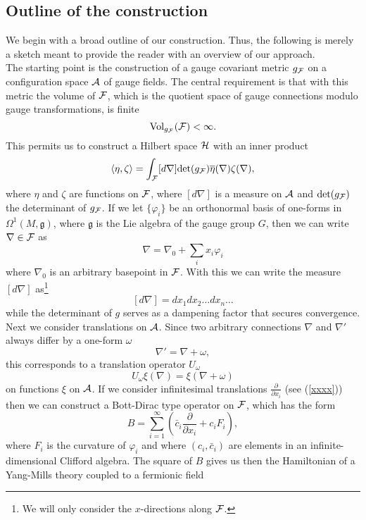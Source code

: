 \documentclass[letterpaper,12pt]{article}
\def\OO{\Omega}
\def\ca{{\cal A}}
\def\cf{{\cal F}}
\def\ch{{\cal H}}
\newcommand{\pa}{\partial}
\begin{document}
\subsection{Outline of the construction}



We begin with a broad outline of 
our construction. Thus, the following is merely a sketch meant to provide the reader with an overview of our approach.\\

The starting point is the construction of a gauge covariant metric $g_\cf$ on a configuration space $\ca$ of gauge fields. The central requirement is that with this metric the volume of $\cf$, which is the quotient space of gauge connections modulo gauge transformations, is finite
$$
\mbox{Vol}_{g_\cf}(\cf) < \infty.
$$
This permits us to construct a Hilbert space $\ch$ with an inner product
$$
\langle \eta, \zeta\rangle = \int_\cf [d\nabla] \mbox{det}(g_\cf)   \overline{\eta}(\nabla)\zeta(\nabla), 
$$
where $\eta$ and $\zeta$ are functions on $\cf$, where $[d\nabla]$ is a measure on $\ca$ and $\mbox{det}(g_\cf)$ the determinant of $g_\cf$. %
If we let $\{\varphi_i\}$ be an orthonormal basis of one-forms in $\OO^1(M,\mathfrak{g})$, where $\mathfrak{g}$ is the Lie algebra of the gauge group $G$, then we can write $\nabla\in\cf$ as
\begin{equation}
\nabla = \nabla_0 + \sum_i x_i \varphi_i
\label{xxxx}
\end{equation}
where $\nabla_0$ is an arbitrary basepoint in $\cf$. With this we can write the measure $[d\nabla]$ as\footnote{We will only consider the $x$-directions along $\cf$.}
$$
[d\nabla] = dx_1 dx_2 \ldots dx_n \ldots 
$$
while the determinant of $g$ 
serves as a dampening factor that secures convergence. 
Next we consider translations on $\ca$. Since two arbitrary connections $\nabla$ and $\nabla'$ always differ by a one-form $\omega$
$$
\nabla' = \nabla+\omega,
$$
this corresponds to a translation operator $U_\omega$
$$
U_\omega \xi(\nabla) = \xi(\nabla+\omega)
$$
on functions $\xi$ on $\ca$. 
If we consider infinitesimal translations 
$
 \frac{\pa}{\pa x_i}
$ 
(see (\ref{xxxx})) then we can construct a Bott-Dirac type operator on $\cf$, which has the form \cite{Aastrup:2019yui}
$$
B= \sum_{i=1}^\infty \left( \bar{c}_i \frac{\pa}{\pa x_i} + {c}_i F_i \right),
$$
where $F_i$ is the curvature of $\varphi_i$ and where $(c_i,\bar{c}_i)$ are elements in an infinite-dimensional Clifford algebra. The square of $B$ gives us then the Hamiltonian of a Yang-Mills theory coupled to a fermionic field
\end{document}
